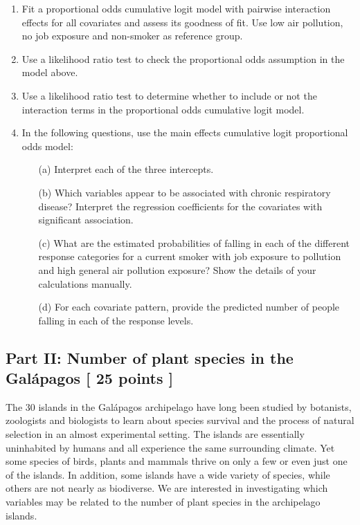 \documentclass[11pt]{article}
\begin{document}
  \vspace*{3mm}                                        

\begin{enumerate}
\item Fit a proportional odds cumulative logit model with pairwise interaction effects for all covariates and assess its goodness of fit. Use low air pollution, no job exposure and non-smoker as reference group.
\item Use a likelihood ratio test to check the proportional odds assumption in the model above.
\item Use a likelihood ratio test to determine whether to include or not the interaction terms in the proportional odds cumulative logit model.
\item In the following questions, use the main effects cumulative logit proportional odds model:
\begin{itemize}
\item[(a)] Interpret each of the three intercepts.
\item[(b)] Which variables appear to be associated with chronic respiratory disease?  Interpret the regression coefficients for the covariates with significant association. 
\item[(c)] What are the estimated probabilities of falling in each of the different response categories for a current smoker with job exposure to pollution and high general air pollution exposure?  Show the details of your calculations manually.
\item[(d)] For each covariate pattern, provide the predicted number of people falling in each of the response levels.
\end{itemize}
\end{enumerate}

  \vspace*{7mm}                                        


\subsection*{Part II:  Number of plant species in the Gal\'{a}pagos [ 25 points ] }

The 30 islands in the Gal\'{a}pagos archipelago have long been studied by botanists, zoologists and biologists to learn about species survival and the process of natural selection in an almost experimental setting. The islands are essentially uninhabited by humans and all experience the same surrounding climate. Yet some species of birds, plants and mammals thrive on only a few or even just one of the islands. In addition, some islands have a wide variety of species, while others are not nearly as biodiverse. We are interested in investigating which variables may be related to the number of plant species in the archipelago islands. \\
\end{document}
